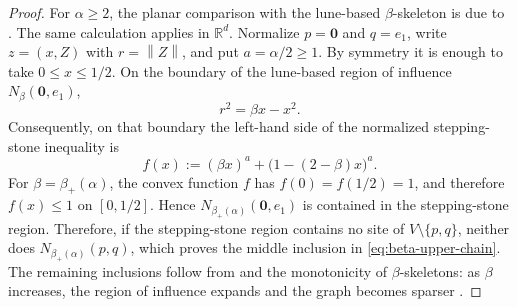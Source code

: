 \documentclass[a4paper,fleqn]{cas-sc}
\theoremstyle{definition}
\theoremstyle{remark}
\newcommand{\R}{\mathds{R}}
\newcommand{\norm}[1]{\left\lVert #1\right\rVert}
\newcommand{\0}{\mathbf{0}}
\begin{document}
\begin{proof}
For $\alpha\geq2$, the planar comparison with the lune-based
$\beta$-skeleton is due to
\citet[Theorem~3.10]{kannangara2018stepping}.  The same calculation applies
in $\R^d$.  Normalize $p=\0$ and $q=e_1$, write
$z=(x,Z)$ with $r=\norm{Z}$, and put $a=\alpha/2\geq1$.  By symmetry it is
enough to take $0\leq x\leq1/2$.  On the boundary of the lune-based
region of influence $N_\beta(\0,e_1)$,
\begin{equation}
    r^2=\beta x-x^2.
\end{equation}
Consequently, on that boundary the left-hand side of the normalized
stepping-stone inequality is
\begin{equation}
    f(x)
    :=(\beta x)^a+\bigl(1-(2-\beta)x\bigr)^a.
\end{equation}
For $\beta=\beta_+(\alpha)$, the convex function $f$ has
$f(0)=f(1/2)=1$, and therefore $f(x)\leq1$ on $[0,1/2]$.  Hence
$N_{\beta_+(\alpha)}(\0,e_1)$ is contained in the stepping-stone region.
Therefore, if the stepping-stone region contains no site of
$V\setminus\{p,q\}$, neither does $N_{\beta_+(\alpha)}(p,q)$, which proves
the middle inclusion in \eqref{eq:beta-upper-chain}.  The remaining
inclusions follow from  and the monotonicity of
$\beta$-skeletons: as $\beta$ increases, the region of influence expands
and the graph becomes sparser
\citep[Observation~1]{bose2006spanning}.


\end{proof}
\end{document}
